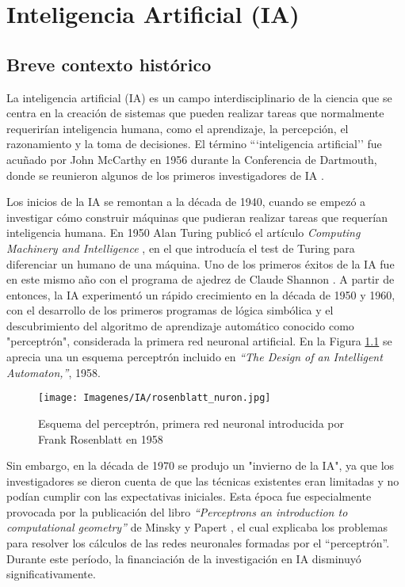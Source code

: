 \documentclass{report}
\begin{document}
\chapter{Inteligencia Artificial (IA)}\label{IA}



\section{Breve contexto histórico}\label{HistoriaIA}

La inteligencia artificial (IA) es un campo interdisciplinario de la ciencia que se centra en la creación de sistemas que pueden realizar tareas que normalmente requerirían inteligencia humana, como el aprendizaje, la percepción, el razonamiento y la toma de decisiones. El término  ```inteligencia artificial'' fue acuñado por John McCarthy en 1956 durante la Conferencia de Dartmouth, donde se reunieron algunos de los primeros investigadores de IA \cite{JohnMccarthy}.

Los inicios de la IA se remontan a la década de 1940, cuando se empezó a investigar cómo construir máquinas que pudieran realizar tareas que requerían inteligencia humana. En 1950 Alan Turing publicó el artículo \textit{Computing Machinery and Intelligence} \cite{AlanTuring}, en el que introducía el test de Turing para diferenciar un humano de una máquina. Uno de los primeros éxitos de la IA fue en este mismo año con el programa de ajedrez de Claude Shannon \cite{ClaudeShannon}. A partir de entonces, la IA experimentó un rápido crecimiento en la década de 1950 y 1960, con el desarrollo de los primeros programas de lógica simbólica y el descubrimiento del algoritmo de aprendizaje automático conocido como "perceptrón", considerada la primera red neuronal artificial. En la Figura \ref{fig:perceptron} se aprecia una un esquema perceptrón incluido en \textit{“The Design of an Intelligent Automaton,”}, 1958.


\vspace{0.4cm}
\begin{figure}[H]
    \centering
    \texttt{[image: Imagenes/IA/rosenblatt\_nuron.jpg]}
    \caption{ Esquema del perceptrón, primera red neuronal introducida por Frank Rosenblatt en 1958 }
    \label{fig:perceptron}
\end{figure}
\vspace{0.4cm}


Sin embargo, en la década de 1970 se produjo un "invierno de la IA", ya que los investigadores se dieron cuenta de que las técnicas existentes eran limitadas y no podían cumplir con las expectativas iniciales. Esta época fue especialmente provocada por la publicación del libro \textit{``Perceptrons an introduction to computational geometry''} de Minsky y Papert \cite{LibroInviernoIA}, el cual explicaba los problemas para resolver los cálculos de las redes neuronales formadas por el ``perceptrón''. Durante este período, la financiación de la investigación en IA disminuyó significativamente.
\end{document}
